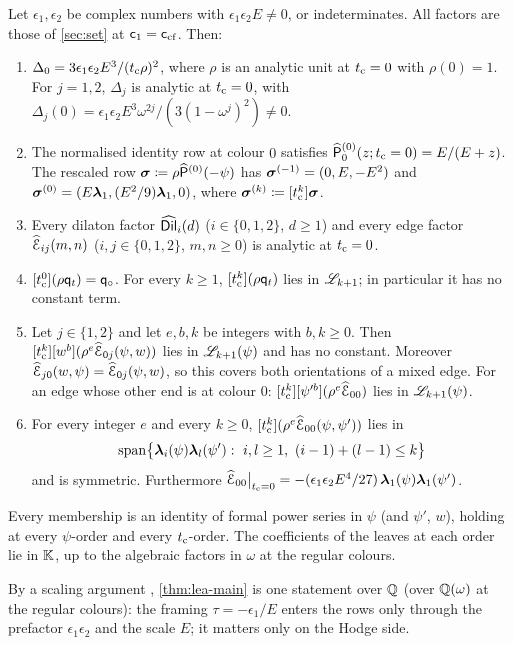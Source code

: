 \begin{thm}\label{thm:lea-main}
Let $\epsilon_1,\epsilon_2$ be complex numbers with $\epsilon_1\epsilon_2E\neq0$, or indeterminates. All factors are those of \cref{sec:set} at $\mathsf{c}_{1}=\mathsf{c}_{\mathrm{cf}}$. Then:
\begin{enumerate}
\item[(F1)] $\Delta_0=3\epsilon_1\epsilon_2E^3/(t_{\mathrm{c}}\rho)^2$, where $\rho$ is an analytic unit at $t_{\mathrm{c}}=0$ with $\rho(0)=1$. For $j=1,2$, $\Delta_j$ is analytic at $t_{\mathrm{c}}=0$, with
$\Delta_j(0)=\epsilon_1\epsilon_2E^3\omega^{2j}/(3(1-\omega^j)^2)\neq0$.
\item[(F2)] The normalised identity row at colour $0$ satisfies $\widehat{\mathsf{P}}_0^{(0)}(z;t_{\mathrm{c}}=0)=E/(E+z)$. The rescaled row $\boldsymbol{\sigma}\coloneqq\rho\widehat{\mathsf{P}}^{(0)}(-\psi)$ has $\boldsymbol{\sigma}^{(-1)}=(0,E,-E^2)$ and $\boldsymbol{\sigma}^{(0)}=(E\boldsymbol{\lambda}_1,(E^2/9)\boldsymbol{\lambda}_1,0)$, where $\boldsymbol{\sigma}^{(k)}\coloneqq[t_{\mathrm{c}}^k]\boldsymbol{\sigma}$.
\item[(F3)] Every dilaton factor $\widehat{\mathsf{Dil}}_i(d)$ ($i\in\{0,1,2\}$, $d\ge1$) and every edge factor $\widehat{\mathcal{E}}_{ij}(m,n)$ ($i,j\in\{0,1,2\}$, $m,n\ge0$) is analytic at $t_{\mathrm{c}}=0$.
\item[(L1)] $[t_{\mathrm{c}}^0](\rho\mathsf{q}_{t})=\mathsf{q}_{\circ}$. For every $k\ge1$, $[t_{\mathrm{c}}^k](\rho\mathsf{q}_{t})$ lies in $\mathscr{L}_{k+1}$; in particular it has no constant term.
\item[(L2)] Let $j\in\{1,2\}$ and let $e,b,k$ be integers with $b,k\ge0$. Then $[t_{\mathrm{c}}^k][w^b](\rho^e\widehat{\mathcal{E}}_{0j}(\psi,w))$ lies in $\mathscr{L}_{k+1}(\psi)$ and has no constant. Moreover $\widehat{\mathcal{E}}_{j0}(w,\psi)=\widehat{\mathcal{E}}_{0j}(\psi,w)$, so this covers both orientations of a mixed edge. For an edge whose other end is at colour $0$: $[t_{\mathrm{c}}^k][\psi'^b](\rho^e\widehat{\mathcal{E}}_{00})$ lies in $\mathscr{L}_{k+1}(\psi)$.
\item[(L3)] For every integer $e$ and every $k\ge0$, $[t_{\mathrm{c}}^k](\rho^e\widehat{\mathcal{E}}_{00}(\psi,\psi'))$ lies in
\[
\mathrm{span}\bigl\{\lf_i(\psi)\lf_l(\psi'):\ i,l\ge1,\ (i-1)+(l-1)\le k\bigr\}
\]
and is symmetric. Furthermore $\widehat{\mathcal{E}}_{00}\big|_{t_{\mathrm{c}}=0}=-(\epsilon_1\epsilon_2E^4/27)\,\boldsymbol{\lambda}_1(\psi)\boldsymbol{\lambda}_1(\psi')$.
\end{enumerate}
Every membership is an identity of formal power series in $\psi$ (and $\psi'$, $w$), holding at every $\psi$-order and every $t_{\mathrm{c}}$-order. The coefficients of the leaves at each order lie in $\mathbb{K}$, up to the algebraic factors in $\omega$ at the regular colours.
\end{thm}

By a scaling argument , \cref{thm:lea-main} is one statement over $\mathbb{Q}$ (over $\mathbb{Q}(\omega)$ at the regular colours): the framing $\tau=-\epsilon_1/E$ enters the rows only through the prefactor $\epsilon_1\epsilon_2$ and the scale $E$; it matters only on the Hodge side.

